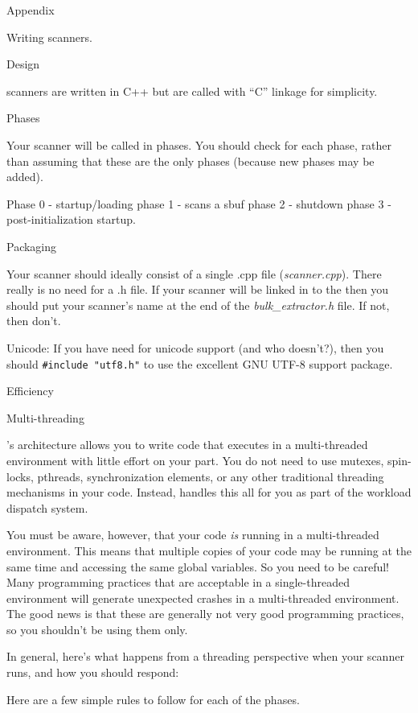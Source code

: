 Appendix


Writing \bulk scanners.

Design

\bulk scanners are written in C++ but are called with ``C'' linkage
for simplicity. 

Phases

Your scanner will be called in phases. You should check for each
phase, rather than assuming that these are the only phases (because
new phases may be added).

Phase 0 - startup/loading
phase 1 - scans a sbuf
phase 2 - shutdown
phase 3 - post-initialization startup.


Packaging

Your scanner should ideally consist of a single .cpp file
(\emph{scanner.cpp}). There really is no need for a .h file. If your
scanner will be linked in to the \bulk then you should put your
scanner's name at the end of the \emph{bulk\_extractor.h} file. If
not, then don't.

Unicode: If you have need for unicode support (and who doesn't?), then you
should \verb|#include "utf8.h"| to use the excellent GNU UTF-8 support package.



Efficiency




Multi-threading

\bulk's architecture allows you to write code that executes in a
multi-threaded environment with little effort on your part. You do not
need to use mutexes, spin-locks, pthreads, synchronization elements,
or any other traditional threading mechanisms in your code. Instead,
\bulk handles this all for you as part of the workload dispatch
system.

You must be aware, however, that your code \emph{is} running in a
multi-threaded environment. This means that multiple copies of your
code may be running at the same time and accessing the same global
variables. So you need to be careful! Many programming practices that
are acceptable in a single-threaded environment will generate
unexpected crashes in a multi-threaded environment. The good news is
that these are generally not very good programming practices, so you
shouldn't be using them only.

In general, here's what happens from a threading perspective when your
scanner runs, and how you should respond:


Here are a few simple rules to follow for each of the phases.

